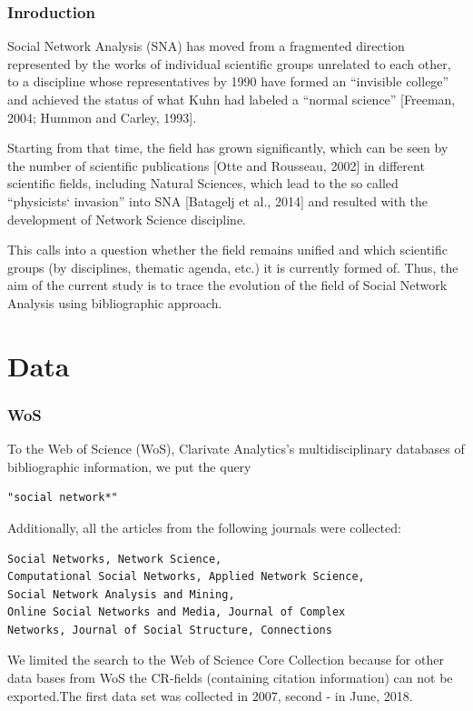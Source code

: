 \documentclass[hyperref={pdfstartview={FitBH -32768},
                         pdfpagemode=FullScreen,
                         plainpages=false,
                         colorlinks=true}
              ]{beamer}
\begin{document}
\begin{frame}[fragile]
\frametitle{Inroduction}
\small

Social Network Analysis (SNA) has moved from a fragmented direction represented by the works of individual scientific groups unrelated to each other, to a discipline whose representatives by 1990 have formed an “invisible college” and achieved the status of  what Kuhn had labeled a “normal science” [Freeman, 2004; Hummon and Carley, 1993]. \medskip

Starting from that time, the field has grown significantly, which can be seen by the number of scientific publications [Otte and Rousseau, 2002] in different scientific fields, including Natural Sciences, which lead to the so called “physicists` invasion” into SNA [Batagelj et al., 2014] and resulted with the development of Network Science discipline. \medskip

This calls into a question whether the field remains unified and which scientific groups (by disciplines, thematic agenda, etc.) it is currently formed of. Thus, the aim of the current study is to trace the evolution of the field of Social Network Analysis using bibliographic approach.  \medskip 

\end{frame}

\section{Data}

\begin{frame}[fragile]
\frametitle{WoS}
\small

To the Web of Science (WoS), Clarivate Analytics’s multidisciplinary databases of bibliographic
information, we put the query
\begin{verbatim} 
"social network*"
\end{verbatim}
Additionally, all the articles from the following journals were collected:
\begin{verbatim}
Social Networks, Network Science, 
Computational Social Networks, Applied Network Science, 
Social Network Analysis and Mining,
Online Social Networks and Media, Journal of Complex 
Networks, Journal of Social Structure, Connections 
\end{verbatim}
We limited the search to the Web of Science Core Collection because for other data bases from WoS the CR-fields (containing citation information) can not
be exported.The first data set was collected in 2007, second - in June, 2018. 
\end{frame}
\end{document}
